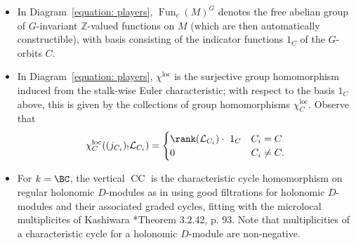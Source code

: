 \documentclass[11pt,letterpaper]{amsart}
\numberwithin{equation}{section}
\begin{document}
\begin{itemize}
\begin{equation*} \begin{split}
DR(-)&=\Omega_M^\bullet\otimes_{\mathcal{O}_M}(-)^{an}[\dim M]\quad \text{and}\\ 
Sol(-)[\dim M]&=Rhom_{\mathcal{D}_M}((-)^{an},\mathcal{O}_M)[\dim M]
\end{split}\end{equation*}
as they appear in the (equivariant) Riemann-Hilbert Correspondence \cite{HTT08}*{Section 7.2} and 
\cite{BL94}*{Section 4.2}, giving the isomorphism across the top of the diagram.
Since the DeRham functor $DR(-)$
and shifted solution functor $Sol(-)[\dim M]$ are exchanged by duality of holonomic $D$-modules fitting with Verdier duality $\mathcal{D}$ \cite{HTT08}*{Proposition 4.2.1 and Corollary 4.6.5}, they agree after composing with $\chi^\mathrm{loc}$ or $\operatorname{CC}$.
Also note that $\chi^\mathrm{loc}$ and $\operatorname{CC}$ both factorize over the functor $\operatorname{For}$ that forgets the equivariant structure of the sheaf, while remembering the Whitney stratification $\mathscr{S}$ (or $\mathscr{S}'$)
of $M$ given by the $G$-orbit (or $G^0$-orbit) structure of $M$ (so that all cohomology sheaves of the underlying constructible sheaf complex $\operatorname{For}\mathcal{F}$ are locally constant on the $G$-orbits $C$ (or $G^0$-orbits $C'$).
\item 
In Diagram~\eqref{equation: players}, $\operatorname{Fun}_{c}(M)^{G}$ denotes the free abelian group of $G$-invariant $\mathbb{Z}$-valued functions on $M$ (which are then automatically constructible), with basis consisting of the indicator functions $1_C$ of the $G$-orbits $C$.
\item 
In Diagram~\eqref{equation: players}, $\chi^\mathrm{loc}$ is the surjective group homomorphism induced from the stalk-wise Euler characteristic; with respect to the basis $1_C$ above, this is given by the collections of group homomorphisms $\chi^\mathrm{loc}_C$.
Observe that 
\begin{equation}\label{equation: chiloc}
\chi^{\textrm{loc}}_{C}((j_{C_i})_!\mathcal{L}_{C_i}) 
= \begin{cases} 
\rank(\mathcal{L}_{C_i})\cdot \ 1_C & C_i = C \\
0 & C_i \ne C.
\end{cases}
\end{equation}
\item 
For $k=\BC$, the vertical $\operatorname{CC}$
is the characteristic cycle homomorphism on regular holonomic $D$-modules as in \cite{Ginsburg:vanishing} using good filtrations for holonomic $D$-modules and their associated graded cycles, fitting with the microlocal multiplicites of Kashiwara \cite{Kas83}*{Theorem 3.2.42, p. 93}. Note that multiplicities of a characteristic cycle for a holonomic $D$-module are non-negative.

\end{itemize}
\end{document}
